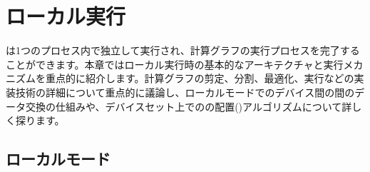 \begin{savequote}[45mm]
\end{savequote}

\chapter{ローカル実行} 
\label{ch:local}

\begin{content}

\tf{}は1つのプロセス内で独立して実行され、計算グラフの実行プロセスを完了することができます。本章ではローカル実行時の基本的なアーキテクチャと実行メカニズムを重点的に紹介します。計算グラフの剪定、分割、最適化、実行などの実装技術の詳細について重点的に議論し、ローカルモードでのデバイス間の間のデータ交換の仕組みや、デバイスセット上でのの配置()アルゴリズムについて詳しく探ります。

\end{content}

\section{ローカルモード}
\label{sec:local-runtime}

